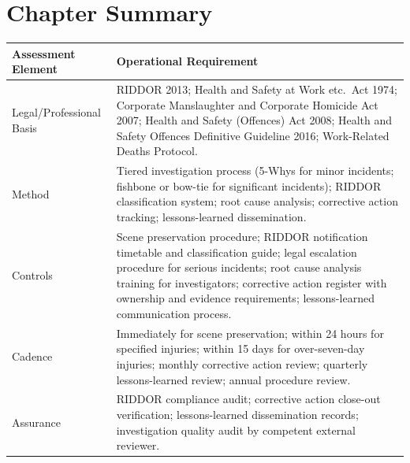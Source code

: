 {

\newpage
\section{Chapter Summary}

\begin{table}[H]
\centering
\begin{tabularx}{\textwidth}{>{\raggedright\arraybackslash}p{3.2cm}X}
\toprule
\textbf{Assessment Element} & \textbf{Operational Requirement} \\
\midrule
Legal/Professional Basis & RIDDOR 2013; Health and Safety at Work etc.\ Act 1974; Corporate Manslaughter and Corporate Homicide Act 2007; Health and Safety (Offences) Act 2008; Health and Safety Offences Definitive Guideline 2016; Work-Related Deaths Protocol. \\
Method & Tiered investigation process (5-Whys for minor incidents; fishbone or bow-tie for significant incidents); RIDDOR classification system; root cause analysis; corrective action tracking; lessons-learned dissemination. \\
Controls & Scene preservation procedure; RIDDOR notification timetable and classification guide; legal escalation procedure for serious incidents; root cause analysis training for investigators; corrective action register with ownership and evidence requirements; lessons-learned communication process. \\
Cadence & Immediately for scene preservation; within 24 hours for specified injuries; within 15 days for over-seven-day injuries; monthly corrective action review; quarterly lessons-learned review; annual procedure review. \\
Assurance & RIDDOR compliance audit; corrective action close-out verification; lessons-learned dissemination records; investigation quality audit by competent external reviewer. \\
\bottomrule
\end{tabularx}
\end{table}

}
